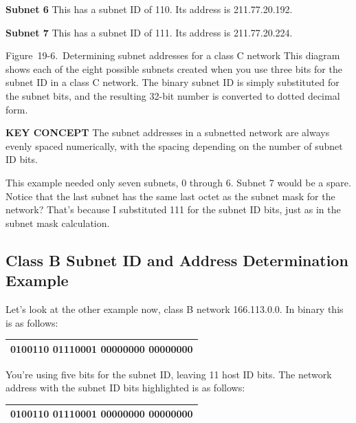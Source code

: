 \documentclass[b5paper,11pt]{memoir}
\begin{document}
{\textbf{Subnet 6}} This has a subnet ID of 110. Its address is
211.77.20.192.

{\textbf{Subnet 7}} This has a subnet ID of 111. Its address is
211.77.20.224.

\protect\hypertarget{ch19s04.htmlux5cux23determining_subnet_addresses_for_a_class}{}{}

\protect\hypertarget{ch19s04.htmlux5cux23I_mediaobject5_d1e20949}{}{}

Figure~19-6.~Determining subnet addresses for a class C network This
diagram shows each of the eight possible subnets created when you use
three bits for the subnet ID in a class C network. The binary subnet ID
is simply substituted for the subnet bits, and the resulting 32-bit
number is converted to dotted decimal form.


{\textbf{KEY CONCEPT}} The subnet addresses in a subnetted network are
always evenly spaced numerically, with the spacing depending on the
number of subnet ID bits.

This example needed only seven subnets, 0 through 6. Subnet 7 would be a
spare. Notice that the last subnet has the same last octet as the subnet
mask for the network? That's because I substituted 111 for the subnet ID
bits, just as in the subnet mask calculation.

\subsection[class B Subnet ID and Address Determination
Example]{\texorpdfstring{\protect\hypertarget{ch19s04.htmlux5cux23class_b_subnet_id_and_address_determinat}{}{}Class
B Subnet ID and Address Determination
Example}{class B Subnet ID and Address Determination Example}}

Let's look at the other example now, class B network 166.113.0.0. In
binary this is as follows:

\begin{longtable}[]{@{}l@{}}
\toprule
\endhead
0100110 01110001 00000000 00000000\tabularnewline
\bottomrule
\end{longtable}

You're using five bits for the subnet ID, leaving 11 host ID bits. The
network address with the subnet ID bits highlighted is as follows:

\begin{longtable}[]{@{}l@{}}
\toprule
\endhead
0100110 01110001 {\textbf{00000}}000 00000000\tabularnewline
\bottomrule
\end{longtable}
\end{document}
